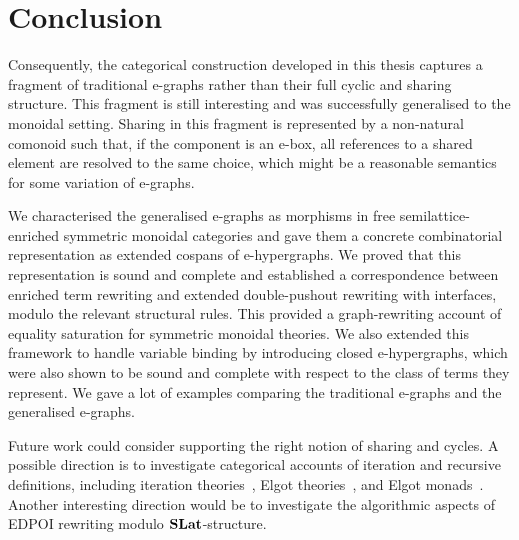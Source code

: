 \section{Conclusion}
Consequently, the categorical construction developed in this thesis captures a fragment of traditional e-graphs rather than their full cyclic and sharing structure.
This fragment is still interesting and was successfully generalised to the monoidal setting.
Sharing in this fragment is represented by a non-natural comonoid such that, if the component is an e-box, all references to a shared element are resolved to the same choice, which might be a reasonable semantics for some variation of e-graphs.

We characterised the generalised e-graphs as morphisms in free semilattice-enriched symmetric monoidal categories and gave them a concrete combinatorial representation as extended cospans of e-hypergraphs.
We proved that this representation is sound and complete and established a correspondence between enriched term rewriting and extended double-pushout rewriting with interfaces, modulo the relevant structural rules.
This provided a graph-rewriting account of equality saturation for symmetric monoidal theories.
We also extended this framework to handle variable binding by introducing closed e-hypergraphs, which were also shown to be sound and complete with respect to the class of terms they represent.
We gave a lot of examples comparing the traditional e-graphs and the generalised e-graphs.

Future work could consider supporting the right notion of sharing and cycles.
A possible direction is to investigate categorical accounts of iteration and recursive definitions, including iteration theories~\cite{bloomIterationTheories1993,goncharovShadesIterationElgot2023}, Elgot theories~\cite{adamekElgotTheoriesNew2011}, and Elgot monads~\cite{goncharovCompleteElgotMonads2016}.
Another interesting direction would be to investigate the algorithmic aspects of EDPOI rewriting modulo $\mathbf{SLat}$-structure.